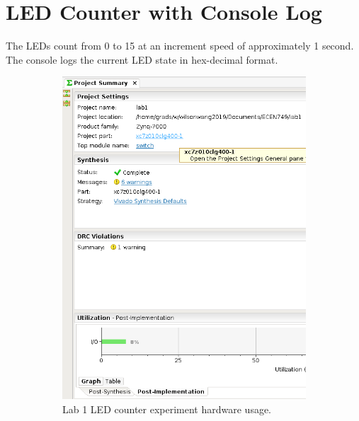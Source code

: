 \documentclass[11pt,letterpaper,titlepage]{article}
\begin{document}
\section{LED Counter with Console Log}

The LEDs count from 0 to 15 at an increment speed of approximately 1 second. The console logs the current LED state in hex-decimal format.

\begin{figure}[h!]
\centering
    \begin{subfigure}{0.49\textwidth}
        \includegraphics[width=\linewidth]{Lab1_Hardware_Usage.png} 
        \caption{Lab 1 LED counter experiment hardware usage.}
    \end{subfigure}
    \begin{subfigure}{0.49\textwidth}

\end{subfigure}
\end{figure}
\end{document}
